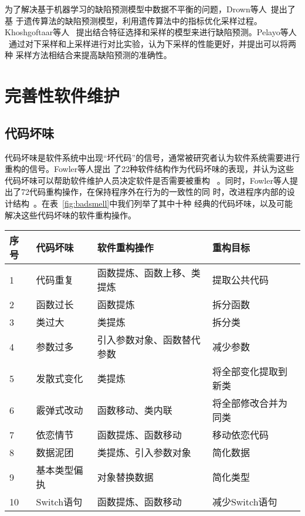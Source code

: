 为了解决基于机器学习的缺陷预测模型中数据不平衡的问题，Drown等人~\cite{drown2009evolutionary}提出了基
于遗传算法的缺陷预测模型，利用遗传算法中的指标优化采样过程。Khoshgoftaar等人
~\cite{khoshgoftaar2010attribute}提出结合特征选择和采样的模型来进行缺陷预测。Pelayo等人
~\cite{pelayo2012evaluating}通过对下采样和上采样进行对比实验，认为下采样的性能更好，并提出可以将两种
采样方法相结合来提高缺陷预测的准确性。

\section{完善性软件维护}

\subsection{代码坏味}
代码坏味是软件系统中出现``坏代码''的信号，通常被研究者认为软件系统需要进行重构的信号。Fowler等人提出
了22种软件结构作为代码坏味的表现，并认为这些代码坏味可以帮助软件维护人员决定软件是否需要被重构
~\cite{fowler1999refactoring}。同时，Fowler等人提出了72代码重构操作，在保持程序外在行为的一致性的同
时，改进程序内部的设计结构~\cite{fowler1999refactoring}。在表~\ref{fig:badsmell}中我们列举了其中十种
经典的代码坏味，以及可能解决这些代码坏味的软件重构操作。

\begin{center}
  \scriptsize
{}\label{fig:badsmell}
\begin{tabular}{llll}
\toprule
序号 & 代码坏味 & 软件重构操作 & 重构目标\\ \hline
1 & 代码重复 & 函数提炼、函数上移、类提炼 & 提取公共代码\\ 
2 & 函数过长 & 函数提炼 & 拆分函数\\ 
3 & 类过大 & 类提炼 & 拆分类\\ 
4 & 参数过多 & 引入参数对象、函数替代参数 & 减少参数\\ 
5 & 发散式变化& 类提炼 & 将全部变化提取到新类\\ 
6 & 霰弹式改动& 函数移动、类内联 & 将全部修改合并为同类\\ 
7 & 依恋情节& 函数提炼、函数移动 & 移动依恋代码\\ 
8 & 数据泥团& 类提炼、引入参数对象 & 简化数据\\ 
9 & 基本类型偏执& 对象替换数据 & 简化类型 \\ 
10 & Switch语句 & 函数提炼、函数移动 & 减少Switch语句\\ 
\bottomrule
\end{tabular}
\end{center}

